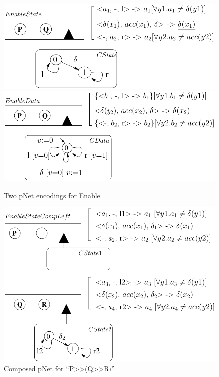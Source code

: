 \documentclass[smallcondensed]{svjour3}
\begin{document}
\begin{figure}[t]
\begin{minipage}{6.1cm}

  \includegraphics[width=\linewidth]{ActaXFIG/Enable1}
  \\[1.3ex]
 \includegraphics[width=\linewidth]{ActaXFIG/Enable2}
  \caption{Two pNet encodings for  Enable }  \label{schema:enable-pnets}
\end{minipage}
  \hspace{2mm}
\begin{minipage}{6cm}
  \includegraphics[width=\linewidth]{ActaXFIG/P-QR}
  \caption{Composed pNet for ``P>>(Q>>R)''}  \label{schema:enable-composed}
\end{minipage}

\end{figure}
\end{document}

